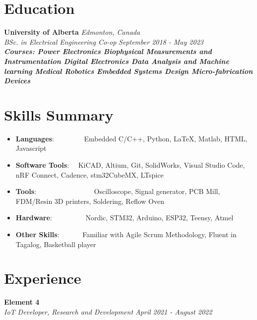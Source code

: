 \documentclass[a4paper,20pt]{article}
\newcommand{\resumeItem}[2]{
  \item\small{
    \textbf{#1}{: #2 \vspace{-2pt}}
  }
}
\newcommand{\resumeSubItem}[2]{\resumeItem{#1}{#2}\vspace{-3pt}}
\newcommand{\resumeSubHeadingListStart}{\begin{itemize}[leftmargin=*]}
\newcommand{\resumeSubHeadingListEnd}{\end{itemize}}
\begin{document}
\section{Education}
    \vspace{-1pt}
        \textbf{University of Alberta} \hspace{10.7cm}
        \textit{Edmonton, Canada} \\
        \textit{BSc. in Electrical Engineering Co-op}\hspace{8.25 cm}
        \textit{September 2018 - May 2023} \\
        \vspace{-10pt}
      {\scriptsize \textit{ \footnotesize{\newline{}\textbf{Courses: Power Electronics \textbullet{} Biophysical Measurements and Instrumentation \textbullet{} Digital Electronics \textbullet{} Data Analysis and Machine learning \textbullet{} Medical Robotics \textbullet{} Embedded Systems Design \textbullet{} Micro-fabrication Devices } }}}

\section{Skills Summary}
	\resumeSubHeadingListStart
	\resumeSubItem{Languages}{~~~~~~~~Embedded C/C++, Python, LaTeX, Matlab, HTML, Javascript}
	\resumeSubItem{Software Tools}{~~KiCAD, Altium, Git, SolidWorks, Visual Studio Code, nRF Connect, Cadence, stm32CubeMX, LTspice}
	\resumeSubItem{Tools}{~~~~~~~~~~~~~~~~Oscilloscope, Signal generator, PCB Mill, FDM/Resin 3D printers, Soldering, Reflow Oven}
    \resumeSubItem{Hardware}{~~~~~~~~~Nordic, STM32, Arduino, ESP32, Teensy, Atmel}
    \resumeSubItem{Other Skills}{~~~~~~Familiar with Agile Scrum Methodology, Fluent in Tagalog, Basketball player}
\resumeSubHeadingListEnd
\vspace{-3pt}

\section{Experience}
    \vspace{-1pt}
        \textbf{Element 4}\hspace{13.5 cm}
        \textit{}\\
        \textit{IoT Developer, Research and Development} \hspace{7.8 cm}
        \textit{April 2021 - August 2022} \\
        \vspace{-18pt} 
        \hspace{-1pt}
\end{document}
